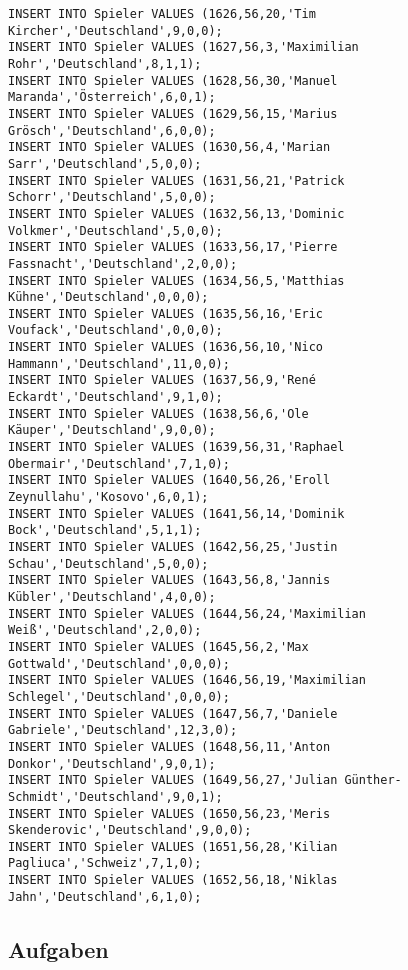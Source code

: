 \documentclass{lehramt-informatik-aufgabe}
\begin{document}
\begin{verbatim}
INSERT INTO Spieler VALUES (1626,56,20,'Tim Kircher','Deutschland',9,0,0);
INSERT INTO Spieler VALUES (1627,56,3,'Maximilian Rohr','Deutschland',8,1,1);
INSERT INTO Spieler VALUES (1628,56,30,'Manuel Maranda','Österreich',6,0,1);
INSERT INTO Spieler VALUES (1629,56,15,'Marius Grösch','Deutschland',6,0,0);
INSERT INTO Spieler VALUES (1630,56,4,'Marian Sarr','Deutschland',5,0,0);
INSERT INTO Spieler VALUES (1631,56,21,'Patrick Schorr','Deutschland',5,0,0);
INSERT INTO Spieler VALUES (1632,56,13,'Dominic Volkmer','Deutschland',5,0,0);
INSERT INTO Spieler VALUES (1633,56,17,'Pierre Fassnacht','Deutschland',2,0,0);
INSERT INTO Spieler VALUES (1634,56,5,'Matthias Kühne','Deutschland',0,0,0);
INSERT INTO Spieler VALUES (1635,56,16,'Eric Voufack','Deutschland',0,0,0);
INSERT INTO Spieler VALUES (1636,56,10,'Nico Hammann','Deutschland',11,0,0);
INSERT INTO Spieler VALUES (1637,56,9,'René Eckardt','Deutschland',9,1,0);
INSERT INTO Spieler VALUES (1638,56,6,'Ole Käuper','Deutschland',9,0,0);
INSERT INTO Spieler VALUES (1639,56,31,'Raphael Obermair','Deutschland',7,1,0);
INSERT INTO Spieler VALUES (1640,56,26,'Eroll Zeynullahu','Kosovo',6,0,1);
INSERT INTO Spieler VALUES (1641,56,14,'Dominik Bock','Deutschland',5,1,1);
INSERT INTO Spieler VALUES (1642,56,25,'Justin Schau','Deutschland',5,0,0);
INSERT INTO Spieler VALUES (1643,56,8,'Jannis Kübler','Deutschland',4,0,0);
INSERT INTO Spieler VALUES (1644,56,24,'Maximilian Weiß','Deutschland',2,0,0);
INSERT INTO Spieler VALUES (1645,56,2,'Max Gottwald','Deutschland',0,0,0);
INSERT INTO Spieler VALUES (1646,56,19,'Maximilian Schlegel','Deutschland',0,0,0);
INSERT INTO Spieler VALUES (1647,56,7,'Daniele Gabriele','Deutschland',12,3,0);
INSERT INTO Spieler VALUES (1648,56,11,'Anton Donkor','Deutschland',9,0,1);
INSERT INTO Spieler VALUES (1649,56,27,'Julian Günther-Schmidt','Deutschland',9,0,1);
INSERT INTO Spieler VALUES (1650,56,23,'Meris Skenderovic','Deutschland',9,0,0);
INSERT INTO Spieler VALUES (1651,56,28,'Kilian Pagliuca','Schweiz',7,1,0);
INSERT INTO Spieler VALUES (1652,56,18,'Niklas Jahn','Deutschland',6,1,0);
\end{verbatim}
\subsection{Aufgaben}
\end{document}
